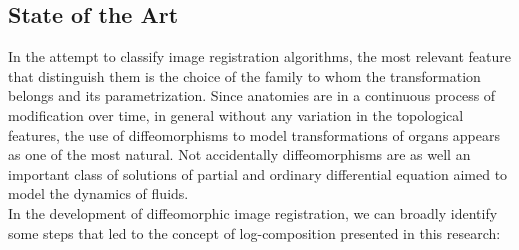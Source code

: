 \subsection{State of the Art}

In the attempt to classify image registration algorithms, the most relevant feature that distinguish them is the choice of the family to whom the transformation belongs and its parametrization. Since anatomies are in a continuous process of modification over time, in general without any variation in the topological features, the use of diffeomorphisms to model transformations of organs appears as one of the most natural. Not accidentally diffeomorphisms are as well an important class of solutions of partial and ordinary differential equation aimed to model the dynamics of fluids. \\
In the development of diffeomorphic image registration, we can broadly identify some steps that led to the concept of log-composition presented in this research:
